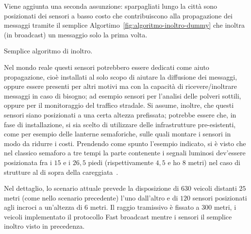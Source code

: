 Viene aggiunta una seconda assunzione: sparpagliati lungo la città sono posizionati dei sensori a basso costo
che contribuiscono alla propagazione dei messaggi tramite il semplice Algortimo~\ref{fig:algoritmo-inoltro-dummy}
che inoltra (in broadcast) un messaggio solo la prima volta.
%
\begin{italianalgorithm}[h]
\begin{algorithmic}[1]
		\EndIf{}
\end{algorithmic}
\caption{Semplice algoritmo di inoltro.}\label{fig:algoritmo-inoltro-dummy}
\end{italianalgorithm}
%
Nel mondo reale questi sensori potrebbero essere dedicati come aiuto propagazione,
cioè installati al solo scopo di aiutare la diffusione dei messaggi,
oppure essere presenti per altri motivi ma con la capacità di ricevere/inoltrare messaggi
in caso di bisogno; ad esempio sensori per l'analisi delle polveri sottili,
oppure per il monitoraggio del traffico stradale.
Si assume, inoltre, che questi sensori siano posizionati a una certa altezza prefissata;
potrebbe essere che, in fase di installazione, si sia scelto di utilizzare delle infrastrutture
pre-esistenti, come per esempio delle lanterne semaforiche, sulle quali montare i sensori in modo da ridurre i costi.
Prendendo come spunto l'esempio indicato, si è visto che nel classico semaforo a tre tempi
la parte contenente i segnali luminosi dev'essere posizionata
fra i $15$ e i $26,5$ piedi (rispettivamente $4,5$ e ho $8$ metri) nel caso di strutture al di sopra della
careggiata~\cite{MUTCD}.

Nel dettaglio, lo scenario attuale prevede la disposizione di $630$ veicoli distanti
$25$ metri (come nello scenario precedente) l'uno dall'altro
e di $120$ sensori posizionati agli incroci a un'altezza di $6$ metri.
Il raggio tramissivo è fissato a $300$ metri, i veicoli implementato il protocollo Fast broadcast
mentre i sensori il semplice inoltro visto in precedenza.

